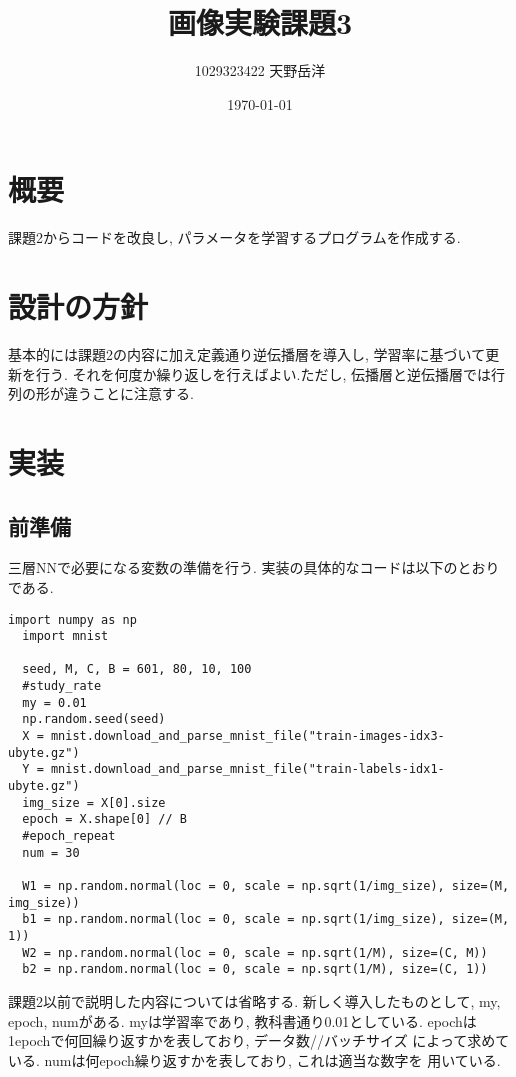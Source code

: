 \documentclass[a4paper,11pt]{jsarticle}
\begin{document}
\title{画像実験課題3}
\author{1029323422 天野岳洋}
\date{\today}
\maketitle
\clearpage

\section{概要}
課題2からコードを改良し, パラメータを学習するプログラムを作成する.

\section{設計の方針}
基本的には課題2の内容に加え定義通り逆伝播層を導入し, 学習率に基づいて更新を行う.
それを何度か繰り返しを行えばよい.ただし,
伝播層と逆伝播層では行列の形が違うことに注意する.

\section{実装}
\subsection*{前準備}
三層NNで必要になる変数の準備を行う. 実装の具体的なコードは以下のとおりである.
\begin{lstlisting}[caption=前準備]
  import numpy as np
  import mnist

  seed, M, C, B = 601, 80, 10, 100
  #study_rate
  my = 0.01
  np.random.seed(seed)
  X = mnist.download_and_parse_mnist_file("train-images-idx3-ubyte.gz")
  Y = mnist.download_and_parse_mnist_file("train-labels-idx1-ubyte.gz")
  img_size = X[0].size
  epoch = X.shape[0] // B
  #epoch_repeat
  num = 30

  W1 = np.random.normal(loc = 0, scale = np.sqrt(1/img_size), size=(M, img_size))
  b1 = np.random.normal(loc = 0, scale = np.sqrt(1/img_size), size=(M, 1))
  W2 = np.random.normal(loc = 0, scale = np.sqrt(1/M), size=(C, M))
  b2 = np.random.normal(loc = 0, scale = np.sqrt(1/M), size=(C, 1))
\end{lstlisting}
\par 
課題2以前で説明した内容については省略する.
新しく導入したものとして, my, epoch, numがある.
myは学習率であり, 教科書通り0.01としている.
epochは1epochで何回繰り返すかを表しており, データ数//バッチサイズ
によって求めている. numは何epoch繰り返すかを表しており, これは適当な数字を
用いている.
\end{document}
